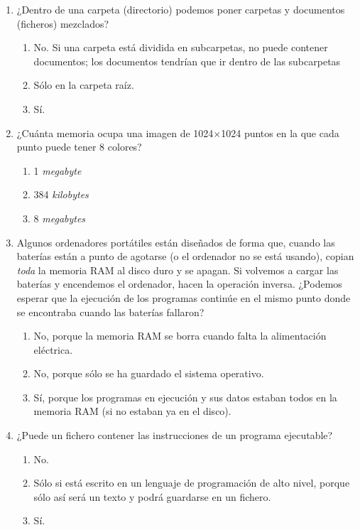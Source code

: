 \begin{enumerate}
\item ¿Dentro de una carpeta (directorio) podemos poner carpetas y documentos (ficheros) mezclados? \begin{enumerate} \item No. Si una carpeta está dividida en subcarpetas, no puede contener documentos; los documentos tendrían que ir dentro de las subcarpetas \item Sólo en la carpeta raíz. \item Sí. \end{enumerate} 

\item ¿Cuánta memoria ocupa una imagen de 1024$\times$1024 puntos en la que cada punto puede tener 8 colores? \begin{enumerate} \item 1 \emph{megabyte} \item 384 \emph{kilobytes} \item 8 \emph{megabytes} \end{enumerate} 

\item Algunos ordenadores portátiles están diseñados de forma que, cuando las baterías están a punto de agotarse (o el ordenador no se está usando), copian \emph{toda} la memoria RAM al disco duro y se apagan. Si volvemos a cargar las baterías y encendemos el ordenador, hacen la operación inversa. ¿Podemos esperar que la ejecución de los programas continúe en el mismo punto donde se encontraba cuando las baterías fallaron? \begin{enumerate} \item No, porque la memoria RAM se borra cuando falta la alimentación eléctrica. \item No, porque sólo se ha guardado el sistema operativo. \item Sí, porque los programas en ejecución y sus datos estaban todos en la memoria RAM (si no estaban ya en el disco). \end{enumerate} 

\item ¿Puede un fichero contener las instrucciones de un programa ejecutable? \begin{enumerate} \item No. \item Sólo si está escrito en un lenguaje de programación de alto nivel, porque sólo así será un texto y podrá guardarse en un fichero. \item Sí. \end{enumerate} 


\end{enumerate}
